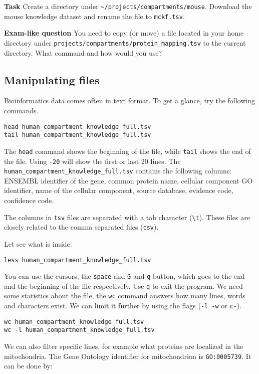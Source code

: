 \documentclass{article}\usepackage[]{graphicx}\usepackage[usenames,dvipsnames]{color}
\begin{document}
\textbf{Task} Create a directory under \verb+~/projects/compartments/mouse+. Download the mouse knowledge dataset and rename the file to \verb+mckf.tsv+.

\textbf{Exam-like question} You need to copy (or move) a file located in your home directory under \verb+projects/compartments/protein_mapping.tsv+ to the current directory. What command and how would you use? 

\subsection{Manipulating files}

Bioinformatics data comes often in text format. To get a glance, try the following commands.

\begin{verbatim}
head human_compartment_knowledge_full.tsv
tail human_compartment_knowledge_full.tsv
\end{verbatim}

The \verb+head+ command shows the beginning of the file, while \verb+tail+ shows the end of the file. Using \verb+-20+ will show the first or last 20 lines. The \verb+human_compartment_knowledge_full.tsv+ contains the following columns: ENSEMBL identifier of the gene, common protein name, cellular component GO identifier, name of the cellular component, source database, evidence code, confidence code.

The columns in \verb+tsv+ files are separated with a tab character (\verb+\t+). These files are closely related to the comma separated files (\verb+csv+).

Let see what is inside:

\begin{verbatim}
less human_compartment_knowledge_full.tsv
\end{verbatim}

You can use the cursors, the \verb+space+ and \verb+G+ and \verb+g+ button, which goes to the end and the beginning of the file respectively. Use \verb+q+ to exit the program. We need some statistics about the file, the \verb+wc+ command answers how many lines, words and characters exist. We can limit it further by using the flags (\verb+-l -w+ or \verb+c-+).

\begin{verbatim}
wc human_compartment_knowledge_full.tsv
wc -l human_compartment_knowledge_full.tsv
\end{verbatim}

We can also filter specific lines, for example what proteins are localized in the mitochondria. The Gene Ontology identifier for mitochondrion is \verb+GO:0005739+. It can be done by:
\end{document}
